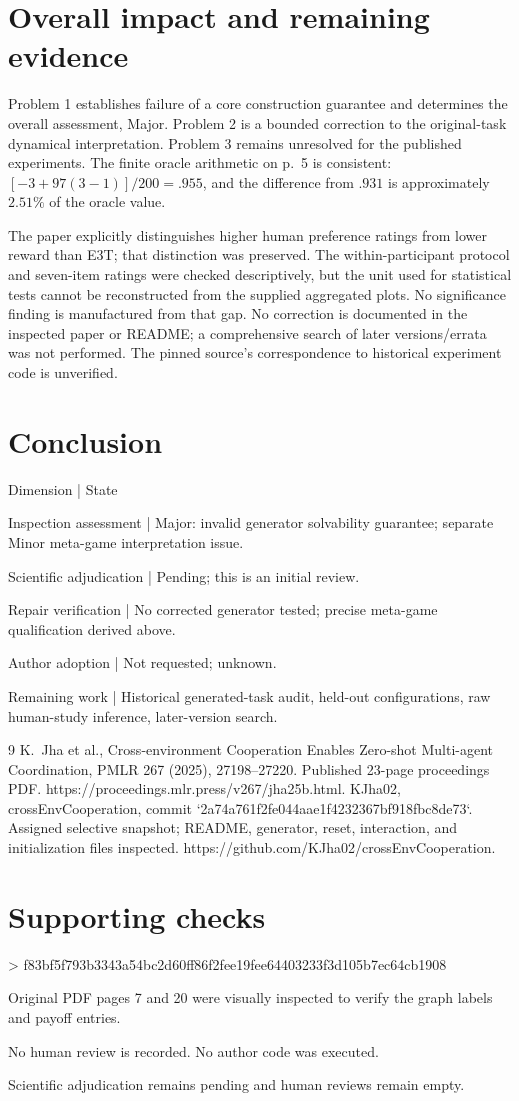 \documentclass[10pt]{article}
\begin{document}
\section*{Overall impact and remaining evidence}
Problem 1 establishes failure of a core construction guarantee and determines the overall assessment, Major. Problem 2 is a bounded correction to the original-task dynamical interpretation. Problem 3 remains unresolved for the published experiments. The finite oracle arithmetic on p. 5 is consistent: \([-3+97(3-1)]/200=.955\), and the difference from \(.931\) is approximately \(2.51\%\) of the oracle value.\par
The paper explicitly distinguishes higher human preference ratings from lower reward than E3T; that distinction was preserved. The within-participant protocol and seven-item ratings were checked descriptively, but the unit used for statistical tests cannot be reconstructed from the supplied aggregated plots. No significance finding is manufactured from that gap. No correction is documented in the inspected paper or README; a comprehensive search of later versions/errata was not performed. The pinned source’s correspondence to historical experiment code is unverified.\par
\section*{Conclusion}
Dimension | State\par
Inspection assessment | Major: invalid generator solvability guarantee; separate Minor meta-game interpretation issue.\par
Scientific adjudication | Pending; this is an initial review.\par
Repair verification | No corrected generator tested; precise meta-game qualification derived above.\par
Author adoption | Not requested; unknown.\par
Remaining work | Historical generated-task audit, held-out configurations, raw human-study inference, later-version search.\par
9 K. Jha et al., Cross-environment Cooperation Enables Zero-shot Multi-agent Coordination, PMLR 267 (2025), 27198–27220. Published 23-page proceedings PDF. https://proceedings.mlr.press/v267/jha25b.html. KJha02, crossEnvCooperation, commit `2a74a761f2fe044aae1f4232367bf918fbc8de73`. Assigned selective snapshot; README, generator, reset, interaction, and initialization files inspected. https://github.com/KJha02/crossEnvCooperation.\par
\section*{Supporting checks}
> f83bf5f793b3343a54bc2d60ff86f2fee19fee64403233f3d105b7ec64cb1908\par
Original PDF pages 7 and 20 were visually inspected to verify the graph labels and payoff entries.\par
No human review is recorded. No author code was executed.\par
Scientific adjudication remains pending and human reviews remain empty.\par
\end{document}
